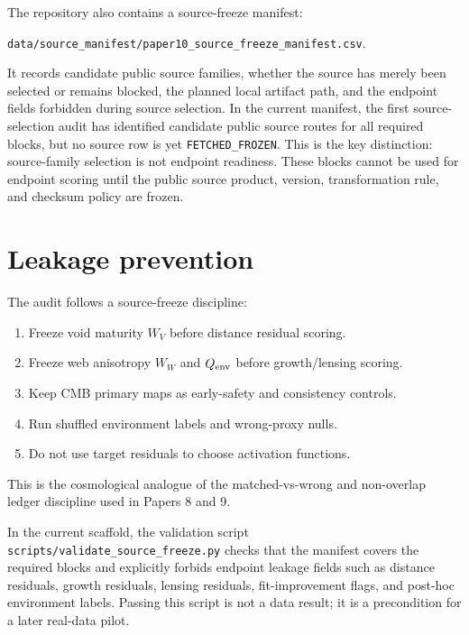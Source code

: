 \documentclass[11pt]{article}
\begin{document}
The repository also contains a source-freeze manifest:
\begin{center}\texttt{data/\allowbreak{}source\_\allowbreak{}manifest/\allowbreak{}paper10\_\allowbreak{}source\_\allowbreak{}freeze\_\allowbreak{}manifest.csv}.\end{center}
It records candidate public source families, whether the source has merely been
selected or remains blocked, the planned local artifact path, and the endpoint
fields forbidden during source selection. In the current manifest, the first
source-selection audit has identified candidate public source routes for all
required blocks, but no source row is yet \texttt{FETCHED\_\allowbreak{}FROZEN}. This is the
key distinction: source-family selection is not endpoint readiness. These
blocks cannot be used for endpoint scoring until the public source product,
version, transformation rule, and checksum policy are frozen.

\section{Leakage prevention}

The audit follows a source-freeze discipline:

\begin{enumerate}[leftmargin=1.5em]
\item Freeze void maturity \(W_V\) before distance residual scoring.
\item Freeze web anisotropy \(W_W\) and \(Q_{\rm env}\) before growth/lensing scoring.
\item Keep CMB primary maps as early-safety and consistency controls.
\item Run shuffled environment labels and wrong-proxy nulls.
\item Do not use target residuals to choose activation functions.
\end{enumerate}

This is the cosmological analogue of the matched-vs-wrong and non-overlap
ledger discipline used in Papers 8 and 9.

In the current scaffold, the validation script
\texttt{scripts/\allowbreak{}validate\_\allowbreak{}source\_\allowbreak{}freeze.py} checks that the manifest covers
the required blocks and explicitly forbids endpoint leakage fields such as
distance residuals, growth residuals, lensing residuals, fit-improvement flags,
and post-hoc environment labels. Passing this script is not a data result; it is
a precondition for a later real-data pilot.
\end{document}
